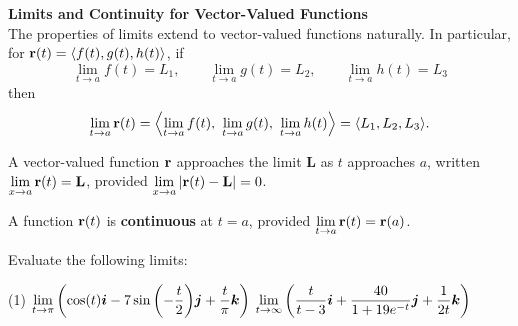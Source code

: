 \documentclass[mathNotesPreamble]{subfiles}
\begin{document}
  \textbf{Limits and Continuity for Vector-Valued Functions}\\
    The properties of limits extend to vector-valued functions naturally. In particular, for ${\mathbf{r}}(t)={\left\langle f(t), g(t), h(t) \right\rangle}$, if
      \[\lim_{t\to a} f(t)=L_1, \qquad \lim_{t\to a} g(t)=L_2, \qquad \lim_{t\to a} h(t)=L_3\]
    then
      \[\lim_{t\to a} {\mathbf{r}}(t)={\left\langle \lim_{t\to a} f(t),\ \lim_{t\to a} g(t),\ \lim_{t\to a} h(t) \right\rangle}={\left\langle L_1,L_2,L_3 \right\rangle}.\]
  \begin{defn*}
    A vector-valued function ${\mathbf{r}}$ approaches the limit $\mathbf L$ as $t$ approaches $a$, written \newline$\displaystyle\lim_{x\to a} {\mathbf{r}}(t)=\mathbf L$, provided $\displaystyle\lim_{x\to a}{\left\vert{\mathbf{r}}(t)-\mathbf L\right\vert}=0$.
    \vspace*{\baselineskip}
    
    A function ${\mathbf{r}}(t)$ is \textbf{continuous} at $t=a$, provided $\displaystyle \lim_{t\to a} {\mathbf{r}}(t)={\mathbf{r}}(a)$.
  \end{defn*}

  \begin{ex*}
    Evaluate the following limits:
    \begin{tasks}[after-item-skip=\stretch{1}, label=](1)
      \task 
        $\displaystyle \lim_{t\to \pi} {\left(\cos(t){\bm{i}}-7\sin{\left(-\frac{t}{2}\right)}{\bm{j}}+\frac{t}{\pi}{\bm{k}}\right)}$
      \task 
        $\displaystyle \lim_{t\to \infty} {\left(\frac{t}{t-3}{\bm{i}}+\frac{40}{1+19e^{-t}}{\bm{j}}+\frac{1}{2t}{\bm{k}}\right)}$
    \end{tasks}
  \end{ex*}

  \pagebreak
  
\end{document}

